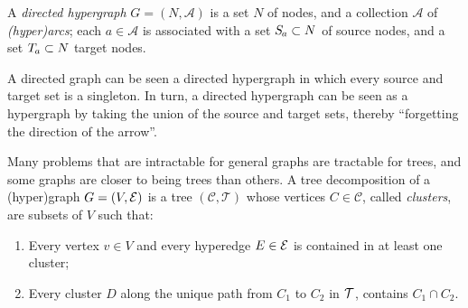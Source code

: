 \documentclass[twoside]{article}
\begin{document}
\begin{defn}
    A \emph{directed hypergraph} $G = (N, \mathcal A)$ is a set $N$ of nodes, and a collection $\mathcal A$ of \emph{(hyper)arcs}; each $a \in \mathcal A$
    is associated with a set $\Src a \subset N$ of source nodes, and a set $\Tgt a \subset N$ target nodes.
\end{defn}
A directed graph can be seen a directed hypergraph in which every source and target set is a singleton.
In turn, a directed hypergraph can be seen as a hypergraph
by taking the union of the source and target sets,
thereby ``forgetting the direction of the arrow''.

Many problems that are intractable for general graphs
are tractable for trees, and
some graphs are closer to being trees than others.
%
A tree decomposition of a (hyper)graph $G = (V, \mathcal E)$ is a tree $(\mathcal C, \mathcal T)$ whose vertices $C \in \mathcal C$, called
\emph{clusters}, are subsets of $V$ such that:

\begin{enumerate}[itemsep=0pt]
    \item Every vertex $v \in V$ and every hyperedge $E \in \mathcal E$ is contained in at least one cluster;
        \item Every cluster $D$ along the unique path from $C_1$ to $C_2$ in $\cal T$,
         contains $C_1 \cap C_2$.
\end{enumerate}
\end{document}
